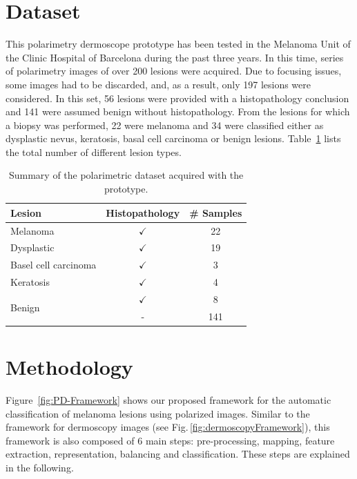 \section{Dataset} \label{sec:chp5-sec4}

This polarimetry dermoscope prototype has been tested in the Melanoma Unit of the Clinic Hospital of Barcelona during the past three years.
In this time, series of polarimetry images of over 200 lesions were acquired.
Due to focusing issues, some images had to be discarded, and, as a result, only 197 lesions were considered. 
In this set, 56 lesions were provided with a histopathology conclusion and 141 were assumed benign without histopathology.
From the lesions for which a biopsy was performed, 22 were melanoma and 34 were classified either as dysplastic nevus, keratosis, basal cell carcinoma or benign lesions.
Table~\ref{tab:table1} lists the total number of different lesion types.
\begin{table}
	\caption[Summary of acquired polarimetric dataset]{Summary of the polarimetric dataset acquired with the prototype.}
	\centering
		\begin{tabular}{l c c}
		\toprule
		Lesion & Histopathology & \# Samples\\
		\midrule
		Melanoma & $\checkmark$ & 22\\
		Dysplastic & $\checkmark$ & 19\\
		Basel cell carcinoma & $\checkmark$ & 3\\
		Keratosis & $\checkmark$ & 4\\
		\multirow{2}{*}{Benign} & $\checkmark$ & 8 \\
		& - & 141 \\
		\bottomrule
		\end{tabular}
	\label{tab:table1}
\end{table}
\clearpage
\section{Methodology} \label{sec:chp5-sec5}

Figure~\ref{fig:PD-Framework} shows our proposed framework for the automatic classification of melanoma lesions using polarized images. 
Similar to the framework for dermoscopy images (see Fig.\,\ref{fig:dermoscopyFramework}), this framework is also composed of 6 main steps: pre-processing, mapping, feature extraction, representation, balancing and classification.
These steps are explained in the following. 




